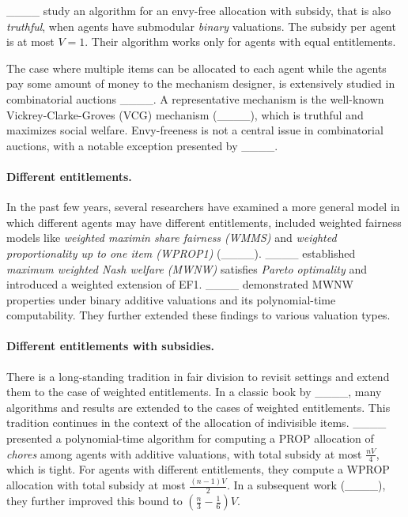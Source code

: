  ____ study an algorithm for an envy-free allocation with subsidy, that is also \emph{truthful}, when agents have submodular \emph{binary} valuations. The subsidy per agent is at most $V=1$.
 Their algorithm works only for agents with equal entitlements.
 
 The case where multiple items can be allocated to each agent while the agents pay some amount of money to the mechanism designer, is extensively studied in combinatorial auctions ____. A representative mechanism is the well-known Vickrey-Clarke-Groves (VCG)  mechanism (____), 
 which is truthful and maximizes social welfare. Envy-freeness is not a central issue in combinatorial auctions, with a notable exception presented by ____.
 
 \paragraph{\textbf{Different entitlements.}}
 In the past few years, several researchers have examined a more general model in which different agents may have different entitlements, included weighted fairness models like \emph{weighted maximin share fairness (WMMS)} and \emph{weighted proportionality up to one item (WPROP1)} (____).
 ____ established \emph{maximum weighted Nash welfare (MWNW)} satisfies \emph{Pareto optimality} and introduced a weighted extension of EF1. ____ demonstrated MWNW properties under binary additive valuations and its polynomial-time computability. They further extended these findings to various valuation types. 
 
 \paragraph{\textbf{Different entitlements with subsidies.}}
 There is a long-standing tradition in fair division to revisit settings and extend them to the case of weighted entitlements. In a classic book by ____, many algorithms and results are extended to the cases of weighted entitlements. This tradition continues in the context of the allocation of indivisible items. 
 ____ presented a polynomial-time algorithm for computing 
 a PROP allocation of \emph{chores} among agents with additive valuations, with total subsidy at most $\frac{n  V}{4}$, which is tight.
 For agents with different entitlements, they compute a WPROP allocation with total subsidy at most $\frac{(n-1)  V}{2}$. 
 In a subsequent work (____), they further improved this bound to $(\frac{n}{3} - \frac{1}{6})V$. 
 
